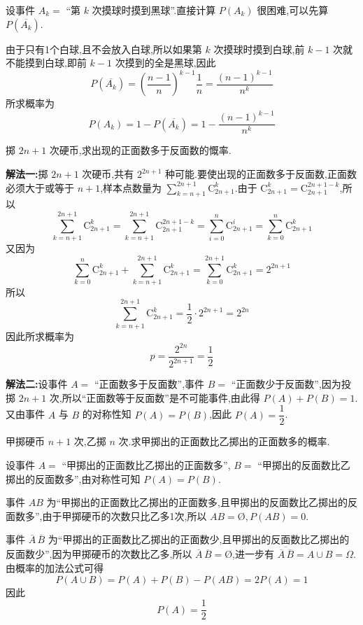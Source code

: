 \begin{solution}
    设事件 $A_k=$ ``第 $k$ 次摸球时摸到黑球''.直接计算 $P(A_k)$ 很困难,可以先算 $P(\overline{A_k})$.
    
    由于只有1个白球,且不会放入白球,所以如果第 $k$ 次摸球时摸到白球,前 $k-1$ 次就不能摸到白球,即前 $k-1$ 次摸到的全是黑球,因此
    $$
    P(\overline{A_k}) = \left( \dfrac{n-1}{n} \right)^{k-1} \dfrac{1}{n} = \dfrac{(n-1)^{k-1}}{n^k}
    $$
    所求概率为
    $$
    P(A_k) = 1 - P(\overline{A_k}) = 1 - \dfrac{(n-1)^{k-1}}{n^k}
    $$
\end{solution}

\question 掷 $2n+1$ 次硬币,求出现的正面数多于反面数的慨率.

\begin{solution}
    
    \textbf{解法一:}掷 $2n+1$ 次硬币,共有 $2^{2n+1}$ 种可能.要使出现的正面数多于反面数,正面数必须大于或等于 $n+1$,样本点数量为 $\displaystyle\sum_{k=n+1}^{2n+1} \mathrm{C}_{2n+1}^k$.由于 $\mathrm{C}_{2n+1}^{k} = \mathrm{C}_{2n+1}^{2n+1-k}$,所以
    $$
    \sum_{k=n+1}^{2n+1} \mathrm{C}_{2n+1}^k = \sum_{k=n+1}^{2n+1} \mathrm{C}_{2n+1}^{2n+1-k} = \sum_{i=0}^{n} \mathrm{C}_{2n+1}^i = \sum_{k=0}^{n} \mathrm{C}_{2n+1}^k
    $$
    又因为
    $$
    \sum_{k=0}^{n} \mathrm{C}_{2n+1}^k + \sum_{k=n+1}^{2n+1} \mathrm{C}_{2n+1}^k = \sum_{k=0}^{2n+1} \mathrm{C}_{2n+1}^k = 2^{2n+1}
    $$
    所以
    $$
    \sum_{k=n+1}^{2n+1} \mathrm{C}_{2n+1}^k = \dfrac{1}{2} \cdot 2^{2n+1} = 2^{2n}
    $$
    因此所求概率为
    $$
    p = \dfrac{2^{2n}}{2^{2n+1}} = \dfrac{1}{2}
    $$

    \textbf{解法二:}设事件 $A=$ ``正面数多于反面数'',事件 $B=$ ``正面数少于反面数'',因为投掷 $2n+1$ 次,所以``正面数等于反面数''是不可能事件,由此得 $P(A) + P(B) = 1$.又由事件 $A$ 与 $B$ 的对称性知 $P(A) = P(B)$,因此 $P(A)=\dfrac{1}{2}$.
\end{solution}

\question 甲掷硬币 $n+1$ 次,乙掷 $n$ 次.求甲掷出的正面数比乙掷出的正面数多的概率.

\begin{solution}
    设事件 $A=$ ``甲掷出的正面数比乙掷出的正面数多'', $B=$ ``甲掷出的反面数比乙掷出的反面数多'',由对称性可知 $P(A) = P(B)$.

    事件 $AB$ 为``甲掷出的正面数比乙掷出的正面数多,且甲掷出的反面数比乙掷出的反面数多'',由于甲掷硬币的次数只比乙多1次,所以 $AB = \text{\O}, P(AB)=0$.
    
    事件 $\overline{A} \, \overline{B}$ 为``甲掷出的正面数比乙掷出的正面数少,且甲掷出的反面数比乙掷出的反面数少'',因为甲掷硬币的次数比乙多,所以 $\overline{A} \, \overline{B} = \text{\O}$,进一步有 $\overline{\overline{A} \, \overline{B}} = A \cup B = \varOmega$.由概率的加法公式可得
    $$
    P(A \cup B) = P(A) + P(B) - P(AB) = 2P(A) = 1
    $$
    因此
    $$
    P(A) = \dfrac{1}{2}
    $$
\end{solution}

